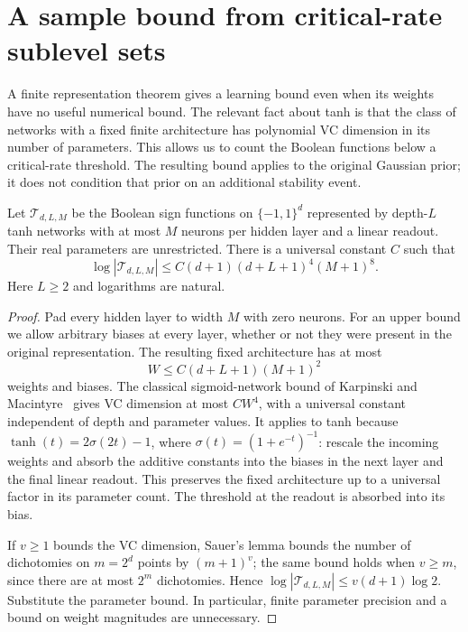 \section{A sample bound from critical-rate sublevel sets}
\label{sec:critical-sublevel-learning}

A finite representation theorem gives a learning bound even when its
weights have no useful numerical bound. The relevant fact about tanh
is that the class of networks with a fixed finite architecture has
polynomial VC dimension in its number of parameters. This allows us
to count the Boolean functions below a critical-rate threshold.
The resulting bound applies to the original Gaussian prior; it does
not condition that prior on an additional stability event.

\begin{lemma}\label{lem:critical-tanh-count}
Let $\mathcal T_{d,L,M}$ be the Boolean sign functions on
$\{-1,1\}^d$ represented by depth-$L$ tanh networks with at most $M$
neurons per hidden layer and a linear readout. Their real parameters
are unrestricted. There is a universal constant $C$ such that
\[
 \log|\mathcal T_{d,L,M}|
 \le C(d+1)(d+L+1)^4(M+1)^8.
\]
Here $L\ge2$ and logarithms are natural.
\end{lemma}

\begin{proof}
Pad every hidden layer to width $M$ with zero neurons. For an upper
bound we allow arbitrary biases at every layer, whether or not they
were present in the original representation. The resulting fixed
architecture has at most
\[
 W\le C(d+L+1)(M+1)^2
\]
weights and biases. The classical sigmoid-network bound of Karpinski
and Macintyre~\cite{karpinski1997} gives VC dimension at most $CW^4$,
with a universal constant independent of depth and parameter values.
It applies to tanh because
$\tanh(t)=2\sigma(2t)-1$, where $\sigma(t)=(1+e^{-t})^{-1}$:
rescale the incoming weights and absorb the additive constants into
the biases in the next layer and the final linear readout.
This preserves the fixed architecture up to a universal factor in
its parameter count. The threshold at the readout is absorbed into
its bias.

If $v\ge1$ bounds the VC dimension, Sauer's lemma bounds the number
of dichotomies on $m=2^d$ points by $(m+1)^v$; the same bound holds
when $v\ge m$, since there are at most $2^m$ dichotomies. Hence
$\log|\mathcal T_{d,L,M}|\le v(d+1)\log2$. Substitute the parameter
bound. In particular, finite parameter precision and a bound on
weight magnitudes are unnecessary.
\end{proof}

